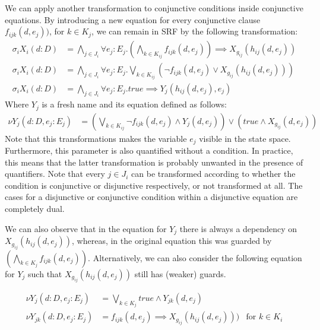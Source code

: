 \documentclass{article}
\begin{document}
We can apply another transformation to conjunctive conditions inside conjunctive equations.
By introducing a new equation for every conjunctive clause $f_{ijk}(d,e_j))$, for $k \in K_j$, we can remain in SRF by the following transformation:
\begin{align*}
  \sigma_i X_i(d:D) &= \bigwedge\limits_{j \in J_i} \forall e_j : E_j . (\bigwedge\limits_{k \in K_{ij}} f_{ijk}(d,e_j)) \implies X_{g_{ij}}(h_{ij}(d, e_j)) \\  
  \sigma_i X_i(d:D) &= \bigwedge\limits_{j \in J_i} \forall e_j : E_j . \bigvee\limits_{k \in K_{ij}} (\neg f_{ijk}(d,e_j) \lor X_{g_{ij}}(h_{ij}(d, e_j))) \\
  \sigma_i X_i(d:D) &= \bigwedge\limits_{j \in J_i} \forall e_j : E_j .  \textit{true} \implies Y_j(h_{ij}(d, e_j), e_j)
\end{align*}
Where $Y_j$ is a fresh name and its equation defined as follows:
\begin{align*}
  \nu Y_j(d : D, e_j : E_j) &= (\bigvee\limits_{k \in K_{ij}} \neg f_{ijk}(d,e_j) \land Y_j(d, e_j)) \lor (\textit{true} \land X_{g_{ij}}(d, e_j))
\end{align*}
Note that this transformations makes the variable $e_j$ visible in the state space.
Furthermore, this parameter is also quantified without a condition.
In practice, this means that the latter transformation is probably unwanted in the presence of quantifiers.
Note that every $j \in J_i$ can be transformed according to whether the condition is conjunctive or disjunctive respectively, or not transformed at all.
The cases for a disjunctive or conjunctive condition within a disjunctive equation are completely dual.

We can also observe that in the equation for $Y_j$ there is always a dependency on $X_{g_{ij}}(h_{ij}(d, e_j))$, whereas, in the original equation this was guarded by $(\bigwedge\limits_{k \in K_j} f_{ijk}(d,e_j))$.
Alternatively, we can also consider the following equation for $Y_j$ such that $X_{g_{ij}}(h_{ij}(d, e_j))$ still has (weaker) guards.

\begin{align*}
  \nu Y_j(d : D, e_j : E_j) &= \bigvee\limits_{k \in K_j} \textit{true} \land Y_{jk}(d, e_j) \\
  \nu Y_{jk}(d : D, e_j : E_j) &= f_{ijk}(d,e_j) \implies X_{g_{ij}}(h_{ij}(d, e_j))) & \text{for } k \in K_i
\end{align*}

\newpage
\end{document}
